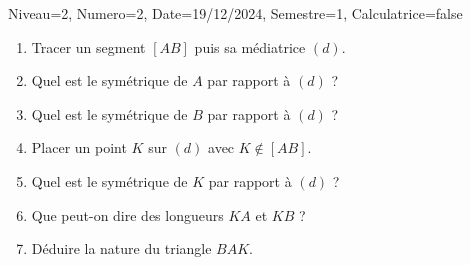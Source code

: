 \documentclass[a4paper,12pt]{article}
\begin{document}
\begin{Maquette}[DS]{Niveau=2, Numero=2, Date=19/12/2024, Semestre=1, Calculatrice=false}
\begin{exercice}[BaremeDetaille]
\begin{enumerate}
\item{} Tracer un segment $[AB]$ puis sa médiatrice $(d)$.
\item{} Quel est le symétrique de $A$ par rapport à $(d)$ ?
\item{} Quel est le symétrique de $B$ par rapport à $(d)$ ?
\item{} Placer un point $K$ sur $(d)$ avec $K\notin [AB]$.
\item{} Quel est le symétrique de $K$ par rapport à $(d)$ ?
\item{} Que peut-on dire des longueurs $KA$ et $KB$ ?
\item{} Déduire la nature du triangle $BAK$.
\end{enumerate}
\anserline[14]
\end{exercice}
\end{Maquette}
\end{document}
